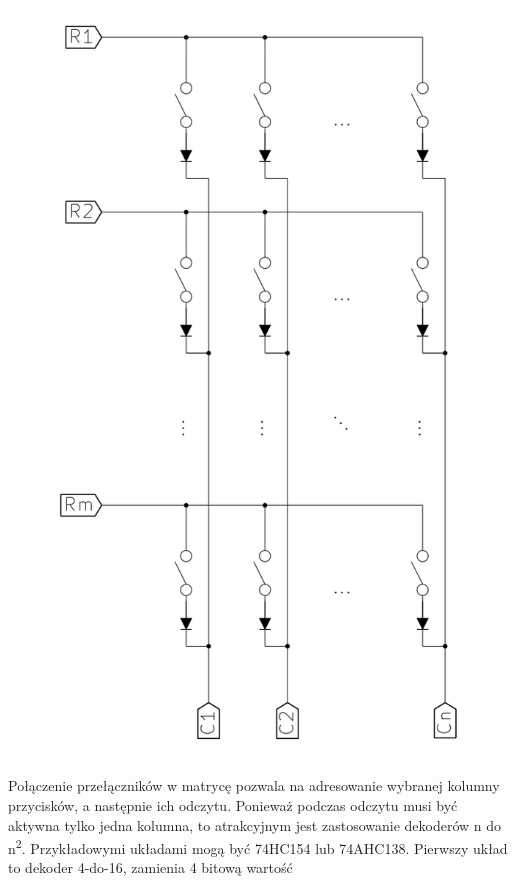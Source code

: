 \documentclass{article}
\begin{document}
    \begin{figure}
        \includegraphics[scale=.5]{komar007}
    \end{figure}
    Połączenie przełączników w matrycę pozwala na adresowanie wybranej kolumny przycisków, a następnie ich odczytu.
    Ponieważ podczas odczytu musi być aktywna tylko jedna kolumna, to atrakcyjnym jest zastosowanie dekoderów n do n\textsuperscript{2}.
    Przykładowymi układami mogą być 74HC154 lub 74AHC138. Pierwszy układ to dekoder 4-do-16, zamienia 4 bitową wartość
\end{document}
